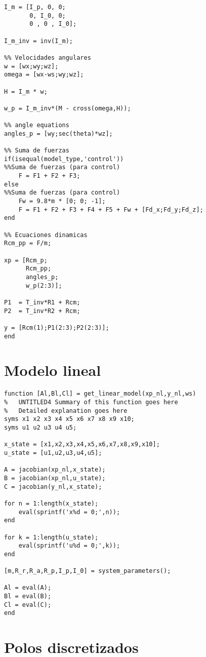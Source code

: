 \begin{lstlisting}[frame=single]
%%Matriz de inercia ???
I_m = [I_p, 0, 0;
       0, I_0, 0;
       0 , 0 , I_0];

I_m_inv = inv(I_m);

%% Velocidades angulares
w = [wx;wy;wz];
omega = [wx-ws;wy;wz];

H = I_m * w;

w_p = I_m_inv*(M - cross(omega,H));

%% angle equations
angles_p = [wy;sec(theta)*wz];

%% Suma de fuerzas
if(isequal(model_type,'control'))
%%Suma de fuerzas (para control)
    F = F1 + F2 + F3;
else
%%Suma de fuerzas (para control)
    Fw = 9.8*m * [0; 0; -1];
    F = F1 + F2 + F3 + F4 + F5 + Fw + [Fd_x;Fd_y;Fd_z];
end

%% Ecuaciones dinamicas
Rcm_pp = F/m;

xp = [Rcm_p;
      Rcm_pp;
      angles_p;
      w_p(2:3)];

P1  = T_inv*R1 + Rcm;
P2  = T_inv*R2 + Rcm;

y = [Rcm(1);P1(2:3);P2(2:3)];
end
\end{lstlisting}
 
\section{Modelo lineal} \label{ap:sistema-ecuaciones-lineales}

\begin{lstlisting}[frame=single]
function [Al,Bl,Cl] = get_linear_model(xp_nl,y_nl,ws)
%	UNTITLED4 Summary of this function goes here
%   Detailed explanation goes here
syms x1 x2 x3 x4 x5 x6 x7 x8 x9 x10;
syms u1 u2 u3 u4 u5;

x_state = [x1,x2,x3,x4,x5,x6,x7,x8,x9,x10];
u_state = [u1,u2,u3,u4,u5];

A = jacobian(xp_nl,x_state);
B = jacobian(xp_nl,u_state);
C = jacobian(y_nl,x_state);

for n = 1:length(x_state);
    eval(sprintf('x%d = 0;',n));
end

for k = 1:length(u_state);
    eval(sprintf('u%d = 0;',k));
end

[m,R_r,R_a,R_p,I_p,I_0] = system_parameters();

Al = eval(A);
Bl = eval(B);
Cl = eval(C);
end

\end{lstlisting}
 
\section{Polos discretizados}

